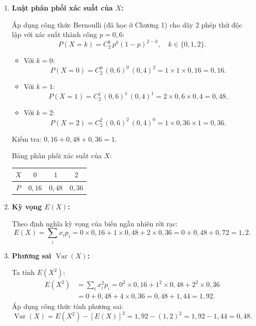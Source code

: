 \documentclass[12pt,a4paper]{article}
\theoremstyle{definition}
\begin{document}
\begin{enumerate}[label=\arabic*)]
    \item \textbf{Luật phân phối xác suất của $X$:}

    Áp dụng công thức Bernoulli (đã học ở Chương 1) cho dãy 2 phép thử độc lập với xác suất thành công $p = 0{,}6$:
    \[
    P(X = k) = C_2^k\, p^k (1-p)^{2-k}, \quad k \in \{0, 1, 2\}.
    \]
    \begin{itemize}
        \item Với $k = 0$:
        \[
        P(X = 0) = C_2^0\, (0{,}6)^0\, (0{,}4)^2 = 1 \times 1 \times 0{,}16 = 0{,}16.
        \]
        \item Với $k = 1$:
        \[
        P(X = 1) = C_2^1\, (0{,}6)^1\, (0{,}4)^1 = 2 \times 0{,}6 \times 0{,}4 = 0{,}48.
        \]
        \item Với $k = 2$:
        \[
        P(X = 2) = C_2^2\, (0{,}6)^2\, (0{,}4)^0 = 1 \times 0{,}36 \times 1 = 0{,}36.
        \]
    \end{itemize}
    Kiểm tra: $0{,}16 + 0{,}48 + 0{,}36 = 1$.

    Bảng phân phối xác suất của $X$:
    \begin{center}
    \begin{tabular}{|c|c|c|c|}
    \hline
    $X$ & $0$ & $1$ & $2$ \\
    \hline
    $P$ & $0{,}16$ & $0{,}48$ & $0{,}36$ \\
    \hline
    \end{tabular}
    \end{center}

    \item \textbf{Kỳ vọng $E(X)$:}

    Theo định nghĩa kỳ vọng của biến ngẫu nhiên rời rạc:
    \[
    E(X) = \sum_i x_i p_i = 0 \times 0{,}16 + 1 \times 0{,}48 + 2 \times 0{,}36 = 0 + 0{,}48 + 0{,}72 = 1{,}2.
    \]

    \item \textbf{Phương sai $\operatorname{Var}(X)$:}

    Ta tính $E(X^2)$:
    \begin{align*}
    E(X^2) &= \sum_i x_i^2 p_i = 0^2 \times 0{,}16 + 1^2 \times 0{,}48 + 2^2 \times 0{,}36 \\
    &= 0 + 0{,}48 + 4 \times 0{,}36 = 0{,}48 + 1{,}44 = 1{,}92.
    \end{align*}
    Áp dụng công thức tính phương sai:
    \[
    \operatorname{Var}(X) = E(X^2) - [E(X)]^2 = 1{,}92 - (1{,}2)^2 = 1{,}92 - 1{,}44 = 0{,}48.
    \]
\end{enumerate}
\end{document}
